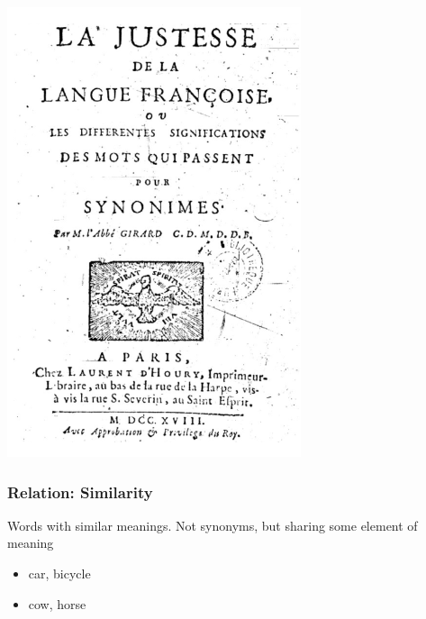 \documentclass[13.5pt,aspecratio=169, xcolor=dvipsnames]{beamer}
\begin{document}
\begin{frame}
\begin{minipage}{0.6\textwidth}
        \end{minipage}
        \begin{minipage}{0.35\textwidth}
            \includegraphics[width=\textwidth]{abbe.png}
        \end{minipage}
    \end{frame}

    \begin{frame}
        \onehalfspacing
            \frametitle{Relation: \textbf{Similarity}}
            {\Large
            Words with similar meanings. Not synonyms, but sharing
some element of meaning
            \bigskip
            \begin{itemize}
                \item car, bicycle
                \item cow, horse
            \end{itemize}
            }
        \end{frame}
\end{document}
